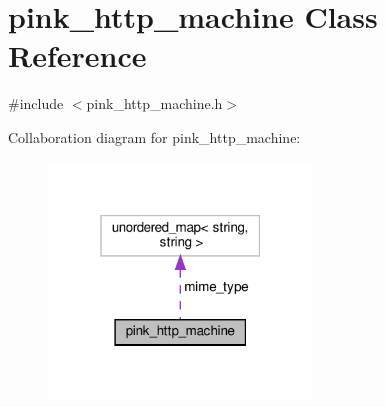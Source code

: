 \hypertarget{classpink__http__machine}{}\section{pink\+\_\+http\+\_\+machine Class Reference}
\label{classpink__http__machine}


{\ttfamily \#include $<$pink\+\_\+http\+\_\+machine.\+h$>$}



Collaboration diagram for pink\+\_\+http\+\_\+machine\+:\nopagebreak
\begin{figure}[H]
\begin{center}
\leavevmode
\includegraphics[width=199pt]{classpink__http__machine__coll__graph}
\end{center}
\end{figure}
